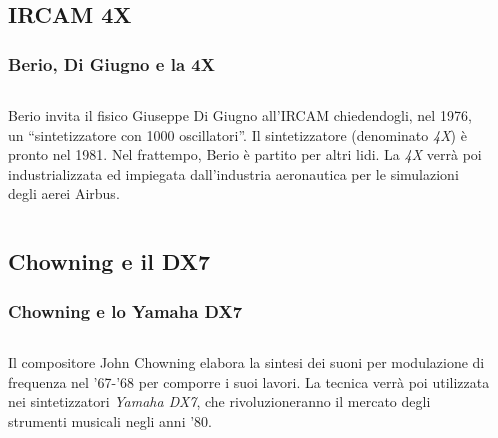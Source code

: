 \documentclass[compress]{beamer}
\begin{document}
\subsection[4X]{IRCAM 4X}

\begin{frame}
    \frametitle{Berio, Di Giugno e la 4X} 

    \begin{columns}[T]
        \begin{column}{0.6\textwidth}
            Berio invita il fisico Giuseppe Di Giugno all'IRCAM chiedendogli,
            nel 1976, un ``sintetizzatore con 1000 oscillatori''. Il
            sintetizzatore (denominato \emph{4X}) \`e pronto nel 1981.
            Nel frattempo, Berio \`e partito per altri lidi. 
            La \emph{4X} verr\`a poi industrializzata ed impiegata dall'industria aeronautica 
            per le simulazioni degli aerei Airbus.
        \end{column}
        \begin{column}{0.4\textwidth}
            \\
        \end{column}
    \end{columns}
\end{frame}

\subsection[DX7]{Chowning e il DX7}

\begin{frame}
    \frametitle{Chowning e lo Yamaha DX7}
    
    \begin{columns}[T]
        \begin{column}{0.6\textwidth}
            Il compositore John Chowning elabora la sintesi dei suoni per
            modulazione di frequenza nel '67-'68 per comporre i suoi lavori.
            La tecnica verr\`a poi utilizzata nei sintetizzatori \emph{Yamaha
            DX7}, che rivoluzioneranno il mercato degli strumenti musicali
            negli anni '80.
        \end{column}
        \begin{column}{0.4\textwidth}
            \begin{center}
            \end{center}
            \hspace{-4cm}
        \end{column}
    \end{columns}

\end{frame}
\end{document}
